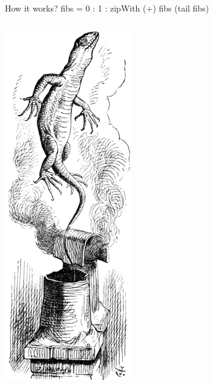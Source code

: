 \documentclass[handout]{beamer}
\begin{document}
\begin{frame}[fragile]{How it works? fibs = 0 : 1 : zipWith (+) fibs (tail fibs)}
\begin{columns}[T]
\begin{column}{.3\textwidth}
  \vspace{-2.0ex}
  \includegraphics[width=\textwidth]{tail.png}
\end{column}

\end{columns}

\end{frame}
\end{document}
